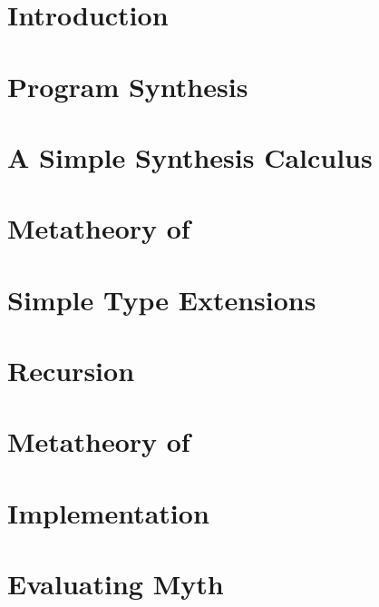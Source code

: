 \chapter{Introduction}
\label{ch:introduction}


\chapter{Program Synthesis}
\label{ch:program-synthesis}


\chapter{A Simple Synthesis Calculus}
\label{ch:a-simple-synthesis-calculus}


\chapter{Metatheory of \texorpdfstring{\lsyn{}}{λsyn}}
\label{ch:metatheory-of-lsyn}


\chapter{Simple Type Extensions}
\label{ch:simple-type-extensions}


\chapter{Recursion}
\label{ch:recursion}


\chapter{Metatheory of \texorpdfstring{\mlsyn{}}{MLsyn}}
\label{ch:metatheory-of-mlsyn}


\chapter{Implementation}
\label{ch:implementation}


\chapter{Evaluating Myth}
\label{ch:evaluating-myth}


